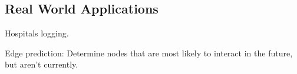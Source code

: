 \subsection{Real World Applications}
\label{sec:Discussion:UseCases}


Hospitals logging.

Edge prediction: Determine nodes that are most likely to interact in the future, but aren't currently.
